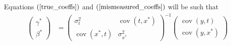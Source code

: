 \documentclass[10pt]{article}
\makeatletter
\renewenvironment{proof}[1][\proofname] {\par\pushQED{\qed}\normalfont\topsep6\p@\@plus6\p@\relax\trivlist\item[\hskip\labelsep\bfseries#1\@addpunct{.}]\ignorespaces}{\popQED\endtrivlist\@endpefalse}
\makeatother
\begin{document}
        \begin{proof}

        Equations $(\ref{true_coeffs})$ and $(\ref{mismeasured_coeffs})$ will be such that
        \begin{align*}
                \left(\begin{array}{l}
            {\gamma}^* \\
            {\beta}^*
            \end{array}\right)&=\left(\begin{array}{cc}
            {\sigma}^2_{t} & \operatorname{cov}({t,x^*}) \\
            \operatorname{cov}({x^*,t}) & {\sigma}_{x^*}^2
            \end{array}\right)^{-1}\left(\begin{array}{c}
            \operatorname{cov}{(y,t)} \\
            \operatorname{cov}{(y,x^*)}
            \end{array}\right) \\
        \end{align*}
                
        \end{proof}	
        
\end{document}
